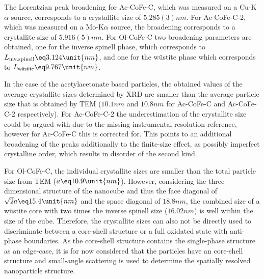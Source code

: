 \documentclass[\main/dresen_thesis.tex]{subfiles}
\begin{document}
    The Lorentzian peak broadening for Ac-CoFe-C, which was measured on a Cu-K$\alpha$ source, corresponds to a crystallite size of $5.285(3) \unit{nm}$.
    For Ac-CoFe-C-2, which was measured on a Mo-K$\alpha$ source, the broadening corresponds to a crystallite size of $5.916(5) \unit{nm}$.
    For Ol-CoFe-C two broadening parameters are obtained, one for the inverse spinell phase, which corresponds to $L_{\mathrm{inv. spinell}} \eq 3.124 \unit{nm}$, and one for the w\"ustite phase which corresponds to $L_{\textsf{w\"ustite}} \eq 9.767 \unit{nm}$.

    In the case of the acetylacetonate based particles, the obtained values of the average crystallite sizes determined by XRD are smaller than the average particle size that is obtained by TEM ($10.1 \unit{nm}$ and $10.8 \unit{nm}$ for Ac-CoFe-C and Ac-CoFe-C-2 respectively).
    For Ac-CoFe-C-2 the underestimation of the crystallite size could be argued with due to the missing instrumental resolution reference, however for Ac-CoFe-C this is corrected for.
    This points to an additional broadening of the peaks additionally to the finite-size effect, as possibly imperfect crystalline order, which results in disorder of the second kind.

    For Ol-CoFe-C, the individual crystallite sizes are smaller than the total particle size from TEM ($a \eq 10.9 \unit{nm}$).
    However, considering the three dimensional structure of the nanocube and thus the face diagonal of $\sqrt{2} a \eq 15.4 \unit{nm}$ and the space diagonal of $18.8 \unit{nm}$, the combined size of a w\"ustite core with two times the inverse spinell size ($16.02 \unit{nm}$) is well within the size of the cube.
    Therefore, the crystallite sizes can also not be directly used to discriminate between a core-shell structure or a full oxidated state with anti-phase boundaries.
    As the core-shell structure contains the single-phase structure as an edge-case, it is for now considered that the particles have an core-shell structure and small-angle scattering is used to determine the spatially resolved nanoparticle structure.

\end{document}
